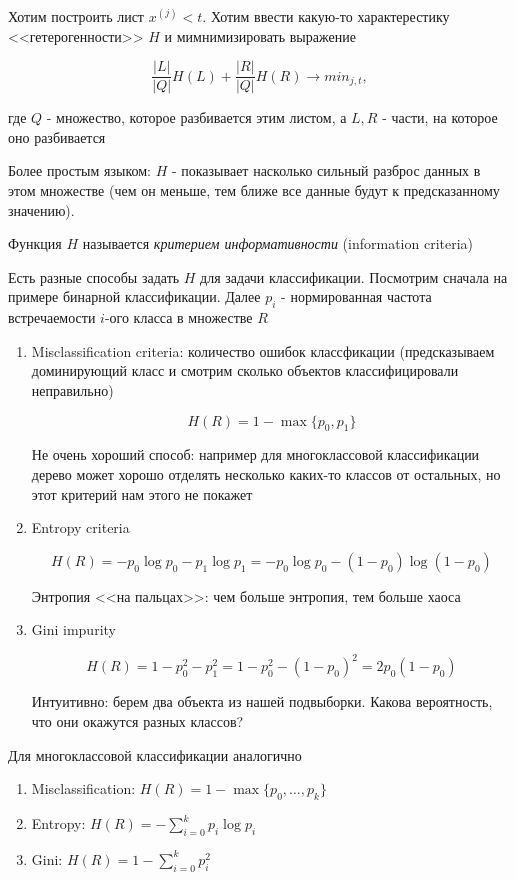 Хотим построить лист $x^{(j)} < t$. Хотим ввести какую-то характерестику <<гетерогенности>> $H$ и мимнимизировать выражение 

\[ \frac{|L|}{|Q|} H(L) + \frac{|R|}{|Q|} H(R) \rightarrow min_{j, t},\]

где $Q$ - множество, которое разбивается этим листом, а $L, R$ - части, на которое оно разбивается

Более простым языком: $H$ - показывает насколько сильный разброс данных в этом множестве (чем он меньше, тем ближе все данные будут к предсказанному значению).

\begin{definition}
    Функция $H$ называется \textit{критерием информативности} (information criteria)
\end{definition}

Есть разные способы задать $H$ для задачи классификации. Посмотрим сначала на примере бинарной классификации. Далее $p_i$ - нормированная частота встречаемости $i$-ого класса в множестве $R$

\begin{enumerate}
    \item Misclassification criteria: количество ошибок классфикации (предсказываем доминирующий класс и смотрим сколько объектов классифицировали неправильно)

    \[ H(R) = 1 - \max\{p_0, p_1\}\]

    Не очень хороший способ: например для многоклассовой классификации дерево может хорошо отделять несколько каких-то классов от остальных, но этот критерий нам этого не покажет

    \item Entropy criteria

    \[ H(R)=-p_0 \log p_0 - p_1 \log p_1 = -p_0 \log p_0 - (1-p_0) \log (1-p_0)\]

    Энтропия <<на пальцах>>: чем больше энтропия, тем больше хаоса

    \item Gini impurity

    \[ H(R)=1 - p_0^2 - p_1^2 = 1 - p_0^2 - (1-p_0)^2=2p_0 (1- p_0)\]

    Интуитивно: берем два объекта из нашей подвыборки. Какова вероятность, что они окажутся разных классов?
\end{enumerate}

Для многоклассовой классификации аналогично

\begin{enumerate}
    \item Misclassification: $H(R)=1- \max \{ p_0, \ldots, p_k \}$

    \item Entropy: $H(R)=-\sum_{i=0}^k p_i \log p_i$

    \item Gini: $H(R)=1 - \sum_{i=0}^k p_i^2$
\end{enumerate}

